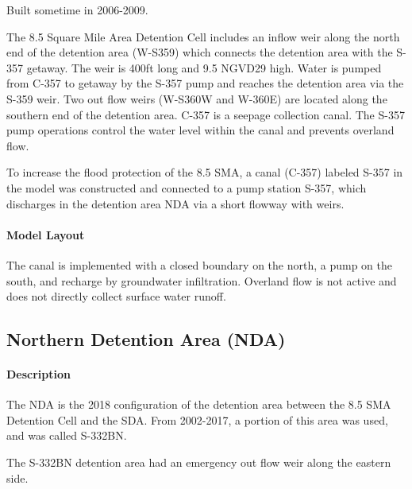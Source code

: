Built sometime in 2006-2009.

The 8.5 Square Mile Area Detention Cell includes an inflow weir along the north end of the detention area (W-S359) which connects the detention area with the S-357 getaway. The weir is 400ft long and 9.5 NGVD29 high. Water is pumped from C-357 to getaway by the S-357 pump and reaches the detention area via the S-359 weir. Two out flow weirs (W-S360W and W-360E) are located along the southern end of the detention area. C-357 is a seepage collection canal. The S-357 pump operations control the water level within the canal and prevents overland flow.

To increase the flood protection of the 8.5 SMA, a canal (C-357) labeled S-357 in the model was constructed and connected to a pump station S-357, which discharges in the detention area NDA via a short flowway with weirs.


\paragraph{Model Layout}
The canal is implemented with a closed boundary on the north, a pump on the south, and recharge by groundwater infiltration. Overland flow is not active and does not directly collect surface water runoff.




\clearpage
\subsection{Northern Detention Area (NDA)}



\paragraph{Description}
The NDA is the 2018 configuration of the detention area between the 8.5 SMA Detention Cell and the SDA. From 2002-2017, a portion of this area was used, and was called S-332BN.

The S-332BN detention area had an emergency out flow weir along the eastern side.

